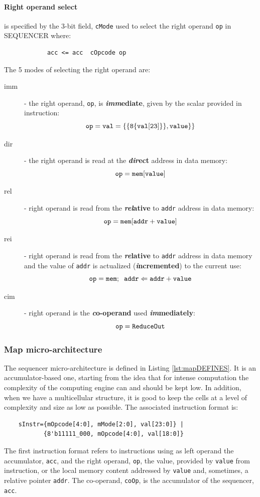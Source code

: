 
\paragraph{Right operand select}
is specified by the 3-bit field,  {\tt cMode}  used to select the right operand  {\tt op} in SEQUENCER where:
\begin{verbatim}
            acc <= acc  cOpcode op
\end{verbatim}
The 5 modes of selecting the right operand are:
\begin{description}
    \item[imm] - the right operand, {\tt op}, is {\bf {\em imm}ediate}, given by the scalar provided in instruction:
        $${\tt op = val = \{\{8\{val[23]\}\}, value\}\}}$$
    \item[dir] - the right operand is read at the {\bf {\em dir}ect} address in data memory:
          $${\tt op = mem[value]}$$
    \item[rel] - right operand is read from the {\bf {\em rel}ative} to {\tt addr} address in data memory:
        $${\tt op = mem[addr + value]}$$
    \item[rei] - right operand is read from the {\bf {\em re}lative} to {\tt addr} address in data memory and the value of {\tt addr} is actualized ({\bf {\em i}ncremented}) to the current use:
        $${\tt op = mem; \;\; addr \Leftarrow addr + value}$$
    \item[cim] - right operand is the {\bf {\em c}o-operand} used {\bf {\em im}mediately}:
         $${\tt op = ReduceOut}$$
\end{description}

\subsubsection{Map micro-architecture}

The sequencer micro-architecture is defined in Listing \ref{lst:mapDEFINES}. It is an accumulator-based one, starting from the idea that for intense computation the complexity of the computing engine can and should be kept low. In addition, when we have a multicellular structure, it is good to keep the cells at a level of complexity and size as low as possible. The associated instruction format is:
\begin{verbatim}
    sInstr={mOpcode[4:0], mMode[2:0], val[23:0]} | 
           {8'b11111_000, mOpcode[4:0], val[18:0]}
\end{verbatim}
The first instruction format refers to instructions using as left operand the accumulator, {\tt acc},  and the right operand, {\tt op}, the value, provided by {\tt value} from instruction, or the local memory content addressed by {\tt value} and, sometimes, a relative pointer {\tt addr}. The co-operand, {\tt coOp}, is the accumulator of the sequencer, {\tt acc}.


